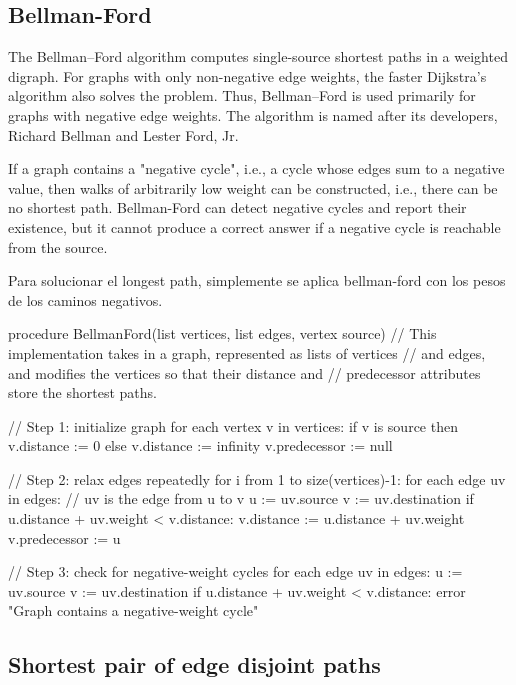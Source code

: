 \documentclass[10pt,letterpaper,twocolumn,twosided]{article}
\newcommand{\codigofuente}[1]{

\dotfill
}
\begin{document}
\codigofuente{../src/dijkstra.${EXT}}


\subsection{Bellman-Ford}

The Bellman–Ford algorithm computes single-source shortest paths in a weighted digraph. For graphs with
only non-negative edge weights, the faster Dijkstra's algorithm also solves the problem. Thus, Bellman–Ford
is used primarily for graphs with negative edge weights. The algorithm is named after its developers, Richard
Bellman and Lester Ford, Jr.

If a graph contains a "negative cycle", i.e., a cycle whose edges sum to a negative value, then walks of
arbitrarily low weight can be constructed, i.e., there can be no shortest path. Bellman-Ford can detect
negative cycles and report their existence, but it cannot produce a correct answer if a negative cycle is
reachable from the source.

Para solucionar el longest path, simplemente se aplica bellman-ford con los pesos de los caminos negativos.

procedure BellmanFord(list vertices, list edges, vertex source)
   // This implementation takes in a graph, represented as lists of vertices
   // and edges, and modifies the vertices so that their distance and
   // predecessor attributes store the shortest paths.

   // Step 1: initialize graph
   for each vertex v in vertices:
       if v is source then v.distance := 0
       else v.distance := infinity
       v.predecessor := null

   // Step 2: relax edges repeatedly
   for i from 1 to size(vertices)-1:
       for each edge uv in edges: // uv is the edge from u to v
           u := uv.source
           v := uv.destination
           if u.distance + uv.weight < v.distance:
               v.distance := u.distance + uv.weight
               v.predecessor := u

   // Step 3: check for negative-weight cycles
   for each edge uv in edges:
       u := uv.source
       v := uv.destination
       if u.distance + uv.weight < v.distance:
           error "Graph contains a negative-weight cycle"


\subsection{Shortest pair of edge disjoint paths}
\end{document}

